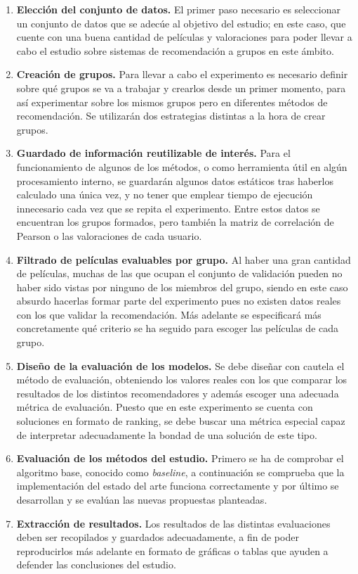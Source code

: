 \begin{enumerate}
	\item \textbf{Elección del conjunto de datos.} El primer paso necesario es seleccionar un conjunto de datos que se adecúe al objetivo del estudio; en este caso, que cuente con una buena cantidad de películas y valoraciones para poder llevar a cabo el estudio sobre sistemas de recomendación a grupos en este ámbito.
	\item \textbf{Creación de grupos.} Para llevar a cabo el experimento es necesario definir sobre qué grupos se va a trabajar y crearlos desde un primer momento, para así experimentar sobre los mismos grupos pero en diferentes métodos de recomendación. Se utilizarán dos estrategias distintas a la hora de crear grupos.
	\item \textbf{Guardado de información reutilizable de interés.} Para el funcionamiento de algunos de los métodos, o como herramienta útil en algún procesamiento interno, se guardarán algunos datos estáticos tras haberlos calculado una única vez, y no tener que emplear tiempo de ejecución innecesario cada vez que se repita el experimento. Entre estos datos se encuentran los grupos formados, pero también la matriz de correlación de Pearson o las valoraciones de cada usuario.
	\item \textbf{Filtrado de películas evaluables por grupo.} Al haber una gran cantidad de películas, muchas de las que ocupan el conjunto de validación pueden no haber sido vistas por ninguno de los miembros del grupo, siendo en este caso absurdo hacerlas formar parte del experimento pues no existen datos reales con los que validar la recomendación. Más adelante se especificará más concretamente qué criterio se ha seguido para escoger las películas de cada grupo.
	\item \textbf{Diseño de la evaluación de los modelos.} Se debe diseñar con cautela el método de evaluación, obteniendo los valores reales con los que comparar los resultados de los distintos recomendadores y además escoger una adecuada métrica de evaluación. Puesto que en este experimento se cuenta con soluciones en formato de ranking, se debe buscar una métrica especial capaz de interpretar adecuadamente la bondad de una solución de este tipo.
	\item \textbf{Evaluación de los métodos del estudio.} Primero se ha de comprobar el algoritmo base, conocido como \textit{baseline}, a continuación se comprueba que la implementación del estado del arte funciona correctamente y por último se desarrollan y se evalúan las nuevas propuestas planteadas.
	\item \textbf{Extracción de resultados.} Los resultados de las distintas evaluaciones deben ser recopilados y guardados adecuadamente, a fin de poder reproducirlos más adelante en formato de gráficas o tablas que ayuden a defender las conclusiones del estudio.
\end{enumerate}

